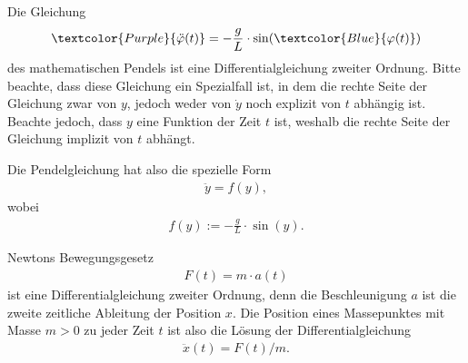 \begin{myexample}
Die Gleichung
\begin{align*}
  \textcolor{Purple}{\ddot{\varphi} (t)} = -\frac{g}{L}\cdot\sin(\textcolor{Blue}{\varphi (t)})
\end{align*}
des mathematischen Pendels ist eine Differentialgleichung zweiter Ordnung. Bitte beachte, dass diese Gleichung ein Spezialfall ist, in dem die rechte Seite der Gleichung zwar von $y$, jedoch weder von $\dot{y}$ noch explizit von $t$ abhängig ist.
Beachte jedoch, dass $y$ eine Funktion der Zeit $t$ ist, weshalb die rechte Seite der Gleichung implizit von $t$ abhängt.

\par
Die Pendelgleichung hat also die spezielle Form
\begin{align*}
  \ddot{y} = f(y),
\end{align*}
wobei
\begin{align*}
  f(y) := -\frac{g}{L}\cdot\sin(y).
\end{align*}
\end{myexample}

\begin{myexample}
  Newtons Bewegungsgesetz
  \begin{align*}
    F(t) = m\cdot a(t)
  \end{align*}
  ist eine Differentialgleichung zweiter Ordnung, denn die Beschleunigung $a$ ist die zweite zeitliche Ableitung der Position $x$. Die Position eines Massepunktes mit Masse $m>0$ zu jeder Zeit $t$ ist also die Lösung der Differentialgleichung
  \begin{align}
    \ddot{x}(t) = F(t)/m.
  \end{align}
\end{myexample}

